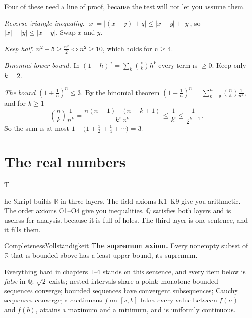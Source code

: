 \documentclass{kaelearn}
\newcommand\Q{\mathbb Q}
\newcommand\R{\mathbb R}
\begin{document}
\medskip
Four of these need a line of proof, because the test will not let you assume them.

\emph{Reverse triangle inequality.} $|x|=|(x-y)+y|\le|x-y|+|y|$, so $|x|-|y|\le|x-y|$. Swap $x$ and $y$.

\emph{Keep half.} $n^2-5\ge\frac{n^2}2\iff n^2\ge10$, which holds for $n\ge4$.

\emph{Binomial lower bound.} In $(1+h)^n=\sum_k\binom nk h^k$ every term is $\ge0$. Keep only $k=2$.

\emph{The bound $(1+\frac1n)^n\le3$.} By the binomial theorem $(1+\frac1n)^n=\sum_{k=0}^n\binom nk\frac1{n^k}$, and for $k\ge1$
\[
  \binom nk\frac1{n^k}=\frac{n(n-1)\cdots(n-k+1)}{k!\;n^k}\le\frac1{k!}\le\frac1{2^{k-1}} .
\]
So the sum is at most $1+\bigl(1+\frac12+\frac14+\cdots\bigr)=3$.

\section{The real numbers}

\opening{T}{he Skript builds} $\R$ in three layers. The field axioms K1--K9 give you arithmetic. The order axioms O1--O4 give
you inequalities. $\Q$ satisfies both layers and is useless for analysis, because it is full of holes. The third layer is one
sentence, and it fills them.

\begin{keystone}{Completeness}{Vollständigkeit}
\textbf{The supremum axiom.} Every nonempty subset of $\R$ that is bounded above has a least upper bound, its supremum.

\smallskip\noindent
Everything hard in chapters 1--4 stands on this sentence, and every item below is \emph{false} in $\Q$: $\sqrt2$ exists; nested
intervals share a point; monotone bounded sequences converge; bounded sequences have convergent subsequences; Cauchy sequences
converge; a continuous $f$ on $[a,b]$ takes every value between $f(a)$ and $f(b)$, attains a maximum and a minimum, and is
uniformly continuous.
\end{keystone}
\end{document}
